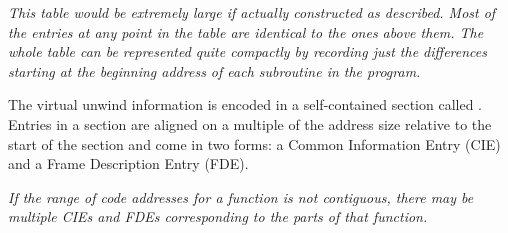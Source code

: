 \textit{This table would be extremely large if actually constructed
as described. Most of the entries at any point in the table
are identical to the ones above them. The whole table can be
represented quite compactly by recording just the differences
starting at the beginning address of each subroutine in
the program.}

The virtual unwind information is encoded in a self-contained
section called 
\dotdebugframe{}.  Entries in a 
\dotdebugframe{} section
are aligned on a multiple of the address size relative to
the start of the section and come in two forms: a Common
Information Entry (CIE) and a 
Frame Description Entry (FDE).

\textit{If the range of code addresses for a function is not
contiguous, there may be multiple CIEs and FDEs corresponding
to the parts of that function.}

